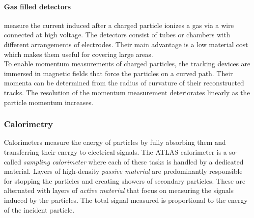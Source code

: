 \paragraph{Gas filled detectors} measure the current induced after a charged particle ionizes a gas via a wire connected at high voltage. The detectors consist of tubes or chambers with different arrangements of electrodes. Their main advantage is a low material cost which makes them useful for covering large areas. \\
\newline
To enable momentum measurements of charged particles, the tracking devices are immersed in magnetic fields that force the particles on a curved path. Their momenta can be determined from the radius of curvature of their reconstructed tracks. The resolution of the momentum measurement deteriorates linearly as the particle momentum increases.

\subsubsection{Calorimetry}

Calorimeters measure the energy of particles by fully absorbing them and transferring their energy to electrical signals.
The ATLAS calorimeter is a so-called \emph{sampling calorimeter} where each of these tasks is handled by a dedicated material.
Layers of high-density \emph{passive material} are predominantly responsible for stopping the particles and creating showers of secondary particles. These are alternated with layers of \emph{active material} that focus on measuring the signals induced by the particles.
The total signal measured is proportional to the energy of the incident particle.

